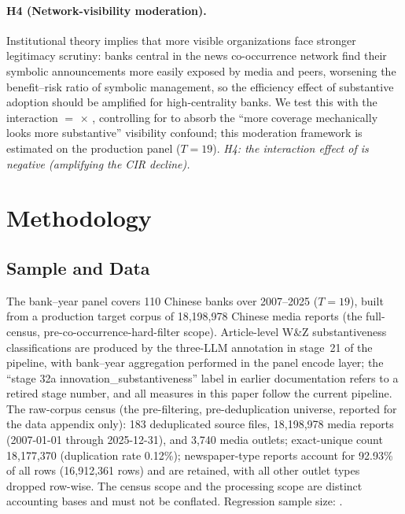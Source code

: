 \paragraph{H4 (Network-visibility moderation).}
Institutional theory implies that more visible organizations face stronger
legitimacy scrutiny: banks central in the news co-occurrence network find
their symbolic announcements more easily exposed by media and peers, worsening
the benefit--risk ratio of symbolic management, so the efficiency effect of
substantive adoption should be amplified for high-centrality banks. We test
this with the interaction  $=$  $\times$
, controlling for  to
absorb the ``more coverage mechanically looks more substantive'' visibility
confound; this moderation framework is estimated on the production panel
($T=19$).
\emph{H4: the interaction effect of  is negative
(amplifying the CIR decline).}

\section{Methodology}\label{sec:method}

\subsection{Sample and Data}
The bank--year panel covers 110 Chinese banks over 2007--2025 ($T=19$), built
from a production target corpus of 18{,}198{,}978 Chinese media reports
(the full-census, pre-co-occurrence-hard-filter scope). Article-level W\&Z substantiveness classifications
are produced by the three-LLM annotation in stage~21 of the
 pipeline, with bank--year aggregation performed in the
panel encode layer; the ``stage 32a innovation\_substantiveness'' label in
earlier documentation refers to a retired stage number, and all measures in
this paper follow the current pipeline. The raw-corpus census (the
pre-filtering, pre-deduplication universe, reported for the data appendix
only): 183 deduplicated source files, 18{,}198{,}978 media reports
(2007-01-01 through 2025-12-31), and 3{,}740 media outlets; exact-unique
count 18{,}177{,}370 (duplication rate 0.12\%); newspaper-type reports
account for 92.93\% of all rows (16{,}912{,}361 rows) and are retained, with
all other outlet types dropped row-wise. The census scope and the processing
scope are distinct accounting bases and must not be conflated. Regression
sample size: .

